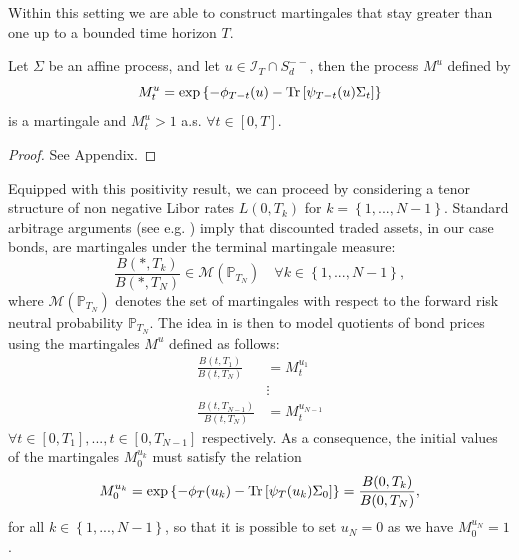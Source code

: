 Within this setting we are able to construct martingales that stay greater than one up to a bounded time horizon $T$.
\begin{theorem}
Let $\Sigma$ be an affine process, and let $u\in\mathcal{I}_{T}\cap S_{d}^{--}$, then the process $M^{u}$ defined by
\begin{equation}
M^{u}_{t}=\exp\left\{ -\phi_{T-t}(u)-\textup{Tr} \left[ \psi_{T-t}(u)\Sigma_{t} \right] \right\}\label{martingale}
\end{equation}
is a martingale and $M^{u}_{t}>1$ a.s. $\forall t \in \left[0,T \right].$
\label{TeoremaMartingale}\end{theorem}

\begin{proof} See Appendix. \end{proof}

Equipped with this positivity result, we can proceed by considering a tenor structure of non negative Libor rates $L(0, T_{k})$ for $k=\left\{ 1,...,N-1\right\}$. Standard arbitrage arguments (see e.g. \cite{Geman_1995}) imply that discounted traded assets, in our case bonds, are martingales under the terminal martingale measure:
\begin{equation}
\frac{B(*,T_{k})}{B(*,T_{N})}\in \mathcal{M}\left( \mathbb{P}_{T_{N}}\right)\quad\forall k \in \left\{ 1,...,N-1\right\},
\end{equation}
where $\mathcal{M}\left( \mathbb{P}_{T_{N}}\right)$ denotes the set of martingales with respect to the forward risk neutral probability $\mathbb{P}_{T_{N}}$. The idea in \cite{article_KRPT2009} is then to model quotients of bond prices using the martingales $M^{u}$ defined as follows:
\begin{align}
\frac{B(t,T_{1})}{B(t,T_{N})}&=M^{u_{1}}_{t}\label{bondstructure1}\\
&\vdots\nonumber\\
\frac{B(t,T_{N-1})}{B(t,T_{N})}&=M^{u_{N-1}}_{t}	\label{bondstructureN}
\end{align}
$\forall t \in \left[ 0, T_{1}\right],...,t \in \left[0,T_{N-1} \right]$ respectively. As a consequence, the initial values of the martingales $M_{0}^{u_{k}}$ must satisfy the relation
\begin{equation}
M_{0}^{u_{k}}=\exp\left\{ -\phi_{T}(u_{k})-\textup{Tr}\left[\psi_{T}(u_{k})\Sigma_{0} \right]\right\}=\frac{B(0,T_{k})}{B(0,T_{N})},
\label{initialbondstructure}\end{equation}
for all $k \in \left\{ 1,...,N-1\right\}$, so that it is possible to set $u_{N}=0$ as we have $M_{0}^{u_{N}}=1$.\\


